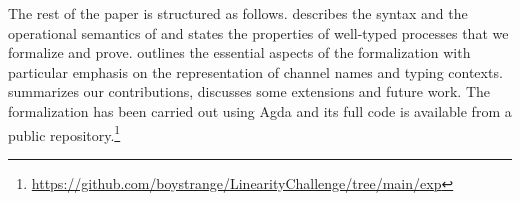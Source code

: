The rest of the paper is structured as follows.  describes
the syntax and the operational semantics of \Calculus and states the properties
of well-typed processes that we formalize and prove.  outlines
the essential aspects of the formalization with particular emphasis on the
representation of channel names and typing contexts. 
summarizes our contributions, discusses some extensions and future work. The
formalization has been carried out using Agda and its full code is available
from a public
repository.\footnote{\url{https://github.com/boystrange/LinearityChallenge/tree/main/exp}}